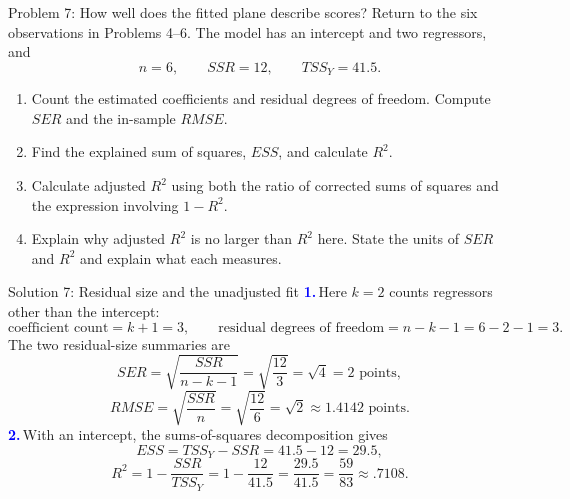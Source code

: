 \documentclass[notes,10pt, aspectratio=169]{beamer}
\newif\ifshowsolutions
\newcommand{\answerpart}[1]{\textcolor{blue}{\textbf{#1.}}\,}
\begin{document}
\begin{frame}{Problem 7: How well does the fitted plane describe scores?}
Return to the six observations in Problems 4--6. The model has an intercept and two regressors, and
\[
n=6,\qquad SSR=12,\qquad TSS_Y=41.5.
\]
\begin{enumerate}
\setlength{\itemsep}{11pt}
\item Count the estimated coefficients and residual degrees of freedom. Compute $SER$ and the in-sample $RMSE$.
\item Find the explained sum of squares, $ESS$, and calculate $R^2$.
\item Calculate adjusted $R^2$ using both the ratio of corrected sums of squares and the expression involving $1-R^2$.
\item Explain why adjusted $R^2$ is no larger than $R^2$ here. State the units of $SER$ and $R^2$ and explain what each measures.
\end{enumerate}
\end{frame}

\ifshowsolutions
\begin{frame}{Solution 7: Residual size and the unadjusted fit}
\small
\answerpart{1}Here $k=2$ counts regressors other than the intercept:
\[
\text{coefficient count}=k+1=3,
\qquad \text{residual degrees of freedom}=n-k-1=6-2-1=3.
\]
The two residual-size summaries are
\[
SER=\sqrt{\frac{SSR}{n-k-1}}=\sqrt{\frac{12}{3}}=\sqrt4=\boxed{2\text{ points}},
\]
\[
RMSE=\sqrt{\frac{SSR}{n}}=\sqrt{\frac{12}{6}}=\sqrt2\approx1.4142\text{ points}.
\]
\answerpart{2}With an intercept, the sums-of-squares decomposition gives
\[
ESS=TSS_Y-SSR=41.5-12=29.5,
\]
\[
R^2=1-\frac{SSR}{TSS_Y}=1-\frac{12}{41.5}
=\frac{29.5}{41.5}=\boxed{\frac{59}{83}\approx.7108}.
\]
\end{frame}
\end{document}
